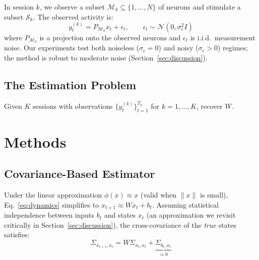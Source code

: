 \documentclass{article}
\begin{document}
In session $k$, we observe a subset $\mathcal{M}_k \subseteq \{1, \ldots, N\}$ of neurons and stimulate a subset $\mathcal{S}_k$.
The observed activity is:
\begin{equation}
    y_t^{(k)} = P_{\mathcal{M}_k} x_t + \epsilon_t, \qquad \epsilon_t \sim \mathcal{N}(0, \sigma_\epsilon^2 I)
\end{equation}
where $P_{\mathcal{M}_k}$ is a projection onto the observed neurons and $\epsilon_t$ is i.i.d.\ measurement noise.
Our experiments test both noiseless ($\sigma_\epsilon = 0$) and noisy ($\sigma_\epsilon > 0$) regimes; the method is robust to moderate noise (Section~\ref{sec:discussion}).

\subsection{The Estimation Problem}

Given $K$ sessions with observations $\{y_t^{(k)}\}_{t=1}^{T_k}$ for $k = 1, \ldots, K$, recover $W$.

\section{Methods}
\label{sec:methods}

\subsection{Covariance-Based Estimator}

Under the linear approximation $\phi(x) \approx x$ (valid when $\|x\|$ is small), Eq.~\eqref{eq:dynamics} simplifies to $x_{t+1} \approx W x_t + b_t$.
Assuming statistical independence between inputs $b_t$ and states $x_t$ (an approximation we revisit critically in Section~\ref{sec:discussion}), the cross-covariance of the \emph{true} states satisfies:
\begin{equation}
    \Sigma_{x_{t+1}, x_t} = W \Sigma_{x_t, x_t} + \underbrace{\Sigma_{b_t, x_t}}_{\approx 0}
    \label{eq:covariance}
\end{equation}
\end{document}
